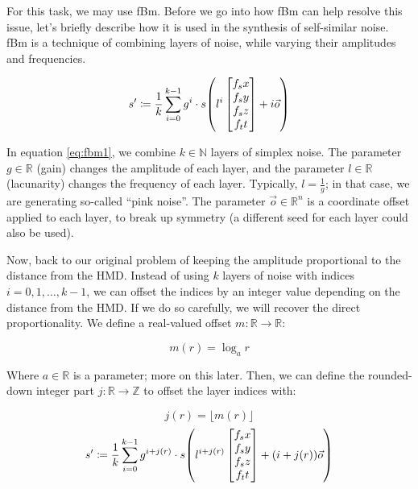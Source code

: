 For this task, we may use \ac{fBm}. Before we go into how \ac{fBm} can help resolve this issue, let's briefly describe how it is used in the synthesis of self-similar noise. \Ac{fBm} is a technique of combining layers of noise, while varying their amplitudes and frequencies.

\begin{equation}\label{eq:fbm1}
    s' \coloneqq \frac{1}{k} \sum_{i=0}^{k-1} g^i \cdot s\mleft(l^{i} \begin{bmatrix}f_sx\\f_sy\\f_sz\\f_tt\end{bmatrix} + i \vec{o}\mright)
\end{equation}

In equation \ref{eq:fbm1}, we combine $k \in \mathbb{N}$ layers of simplex noise. The parameter $g \in \mathbb{R}$ (gain) changes the amplitude of each layer, and the parameter $l \in \mathbb{R}$ (lacunarity) changes the frequency of each layer. Typically, $l = \frac{1}{g}$; in that case, we are generating so-called ``pink noise''. The parameter $\vec{o} \in \mathbb{R}^n$ is a coordinate offset applied to each layer, to break up symmetry (a different seed for each layer could also be used).

Now, back to our original problem of keeping the amplitude proportional to the distance from the \ac{HMD}. Instead of using $k$ layers of noise with indices $i = 0, 1, \dots, k - 1$, we can offset the indices by an integer value depending on the distance from the \ac{HMD}. If we do so carefully, we will recover the direct proportionality. We define a real-valued offset $m \colon \mathbb{R} \to \mathbb{R}$:

\begin{equation}
    m(r) = \log_a r
\end{equation}

Where $a \in \mathbb{R}$ is a parameter; more on this later. Then, we can define the rounded-down integer part $j \colon \mathbb{R} \to \mathbb{Z}$ to offset the layer indices with:

\begin{equation}
    j(r) = \lfloor m(r) \rfloor
\end{equation}
\begin{equation}\label{eq:fbm2}
    s' \coloneqq \frac{1}{k} \sum_{i=0}^{k-1} g^{i+j(r)} \cdot s\mleft(l^{i+j(r)} \begin{bmatrix}f_sx\\f_sy\\f_sz\\f_tt\end{bmatrix} + (i + j(r)) \vec{o}\mright)
\end{equation}

